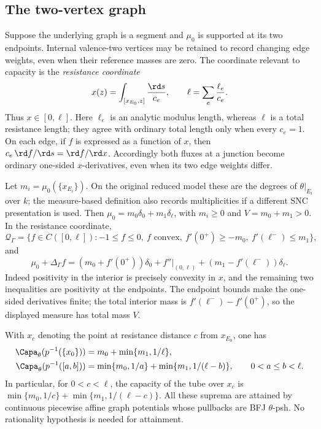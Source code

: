 \subsection{The two-vertex graph}
\label{sec:ch25-two-vertex}

Suppose the underlying graph is a segment and \(\mu_0\) is supported
at its two endpoints.  Internal valence-two vertices may be retained
to record changing edge weights, even when their reference masses
are zero.  The coordinate relevant to capacity is the
\emph{resistance coordinate}
\begin{equation}
\label{eq:ch25-resistance-coordinate}
 x(z)=\int_{[x_{E_0},z]}\frac{\rd s}{c_e},\qquad
 \ell=\sum_e\frac{\ell_e}{c_e}.
\end{equation}
Thus \(x\in[0,\ell]\).  Here \(\ell_e\) is an analytic modulus
length, whereas \(\ell\) is a total resistance length; they agree
with ordinary total length only when every \(c_e=1\).
On each edge, if \(f\) is expressed as a function of \(x\), then
\(c_e\,\rd f/\rd s=\rd f/\rd x\).
Accordingly both fluxes at a junction become ordinary one-sided
\(x\)-derivatives, even when its two edge weights differ.

Let \(m_i=\mu_0(\{x_{E_i}\})\).  On the original reduced model these
are the degrees of \(\theta|_{E_i}\) over \(k\); the measure-based
definition also records multiplicities if a different SNC
presentation is used.  Then
\(\mu_0=m_0\delta_0+m_1\delta_\ell\), with \(m_i\geq0\) and
\(V=m_0+m_1>0\).
In the resistance coordinate,
\begin{equation}
\label{eq:ch25-segment-class}
 \mathcal Q_\Gamma
 =\{f\in C([0,\ell]): -1\leq f\leq0,\ f\text{ convex},\
       f'(0^+)\geq-m_0,\ f'(\ell^-)\leq m_1\},
\end{equation}
and
\begin{equation}
\label{eq:ch25-segment-measure}
 \mu_0+\Delta_\Gamma f
  =(m_0+f'(0^+))\delta_0
       +f''|_{(0,\ell)}+(m_1-f'(\ell^-))\delta_\ell .
\end{equation}
Indeed positivity in the interior is precisely convexity in \(x\),
and the remaining two inequalities are positivity at the endpoints.
The endpoint bounds make the one-sided derivatives finite; the
total interior mass is \(f'(\ell^-)-f'(0^+)\), so the displayed
measure has total mass \(V\).

\begin{proposition}
\label{prop:ch25-segment-capacities}
With \(x_c\) denoting the point at resistance distance \(c\) from
\(x_{E_0}\), one has
\begin{align}
\label{eq:ch25-cap-endpoint}
 \Capa_\theta(p^{-1}(\{x_0\}))
   &=m_0+\min\{m_1,1/\ell\},\\
\label{eq:ch25-cap-interval}
 \Capa_\theta(p^{-1}([a,b]))
   &=\min\{m_0,1/a\}+\min\{m_1,1/(\ell-b)\},
       \qquad 0<a\leq b<\ell.
\end{align}
In particular, for \(0<c<\ell\), the capacity of the tube over
\(x_c\) is \(\min\{m_0,1/c\}+\min\{m_1,1/(\ell-c)\}\).
All these suprema are attained by continuous piecewise affine graph
potentials whose pullbacks are BFJ \(\theta\)-psh.
No rationality hypothesis is needed for attainment.
\end{proposition}

